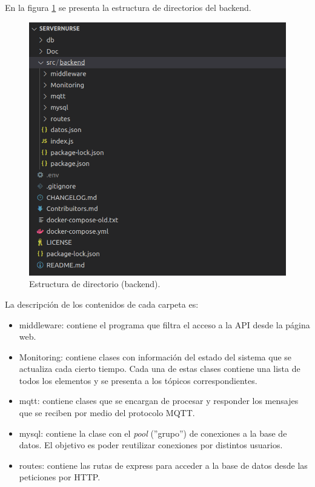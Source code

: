 En la figura \ref{fig:Estructura de directorio (backend)} se presenta la estructura de directorios del backend.

\begin{figure}[ht]
	\centering
	\includegraphics[scale=.45]{./Figures/projectStructure.png}
	\caption{Estructura de directorio (backend).}
	\label{fig:Estructura de directorio (backend)}
\end{figure}

La descripción de los contenidos de cada carpeta es:
\begin{itemize}
\item middleware: contiene el programa que filtra el acceso a la API desde  la página web.
\item Monitoring: contiene clases con información del estado del sistema que se actualiza cada cierto tiempo. Cada una de estas clases contiene una lista de todos los elementos y se presenta a los tópicos correspondientes.
\item mqtt: contiene clases que se encargan de procesar y responder los mensajes que se reciben por medio del protocolo MQTT.
\item mysql: contiene la clase con el \textit{pool} (''grupo'') de conexiones a la base de datos. El objetivo es poder reutilizar conexiones por distintos usuarios.
\item routes: contiene las rutas de express para acceder a la base de datos desde las peticiones por HTTP.
\end{itemize}

